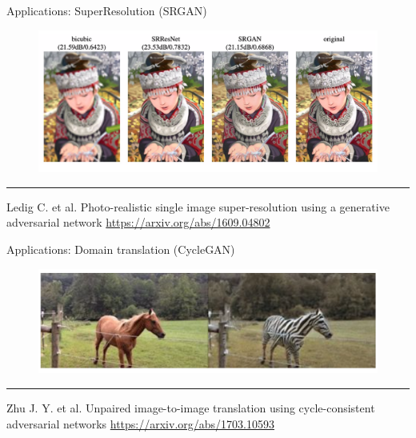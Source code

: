 \begin{frame}{Applications: SuperResolution (SRGAN)}
    \begin{figure}
        \centering
        \includegraphics[width=1.0\linewidth]{figs/srgan.png}
        \label{fig:srgan}
    \end{figure}
\vfill
\hrule\medskip
{\scriptsize Ledig C. et al. Photo-realistic single image super-resolution using a generative adversarial network  \href{https://arxiv.org/abs/1609.04802}{https://arxiv.org/abs/1609.04802}}
\end{frame}
\begin{frame}{Applications: Domain translation (CycleGAN)}
    \begin{figure}
        \centering
        \includegraphics[width=1.0\linewidth]{figs/cyclegan.png}
        \label{fig:cyclegan}
    \end{figure}
\vfill
\hrule\medskip
{\scriptsize Zhu J. Y. et al. Unpaired image-to-image translation using cycle-consistent adversarial networks  \href{https://arxiv.org/abs/1703.10593}{https://arxiv.org/abs/1703.10593}}
\end{frame}
